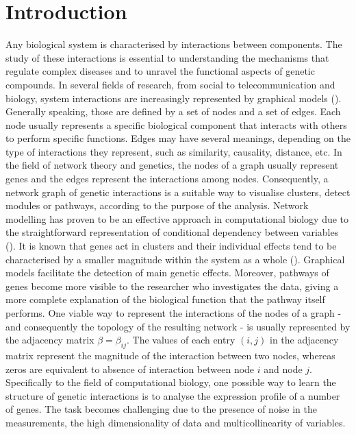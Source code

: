 \section{Introduction}
Any biological system is characterised by interactions between components. The study of these interactions is essential to understanding the mechanisms that regulate complex diseases and to unravel the functional aspects of genetic compounds. 
In several fields of research, from social to telecommunication and biology, system interactions are increasingly represented by graphical models (\citealp{Vidal2011Complex, BAR03a, wisdomcrowds}). Generally speaking, those are defined by a set of nodes and a set of edges. Each node usually represents a specific biological component that interacts with others to perform specific functions. Edges may have several meanings, depending on the type of interactions they represent, such as similarity, causality, distance, etc. 
In the field of network theory and genetics, the nodes of a graph usually represent genes and the edges represent the interactions among nodes. Consequently, a network graph of genetic interactions is a suitable way to visualise clusters, detect modules or pathways, according to the purpose of the analysis.
Network modelling has proven to be an effective approach in computational biology due to the straightforward representation of conditional dependency between variables (\citealp{netmedicine1, netmedicine2}).
It is known that genes act in clusters and their individual effects tend to be characterised by a smaller magnitude within the system as a whole (\citealp{Michalak2008243, YiST07}). Graphical models facilitate the detection of  main genetic effects. Moreover, pathways of genes become more visible to the researcher who investigates the data, giving a more complete explanation of the biological function that the pathway itself performs.
One viable way to represent the interactions of the nodes of a graph - and consequently the  topology of the resulting network - is usually represented by the adjacency matrix $\beta = \beta_{ij}$. The values of each entry $(i,j)$ in the adjacency matrix represent the magnitude of the interaction between two nodes, whereas zeros are equivalent to absence of interaction between node $i$ and node $j$. 
Specifically to the field of computational biology, one possible way to learn the structure of genetic interactions is to analyse the expression profile of a number of genes. The task becomes challenging due to the presence of noise in the measurements, the high dimensionality of data and multicollinearity of variables. 
